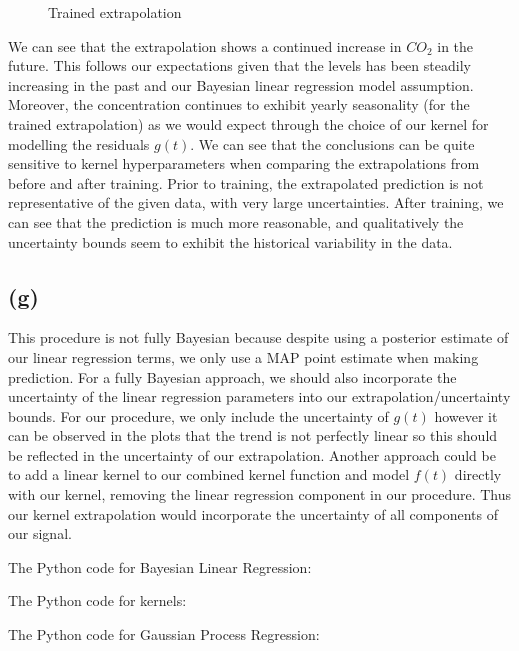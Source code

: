 \documentclass[12pt]{article}
\begin{document}
\begin{figure}[h]
\begin{minipage}{.5\textwidth}
\caption{Trained extrapolation}
\label{fig:f-extrapolation-trained}
\end{minipage}
\end{figure}

We can see that the extrapolation shows a continued increase in $CO_2$ in the future.
This follows our expectations given that the levels has been steadily increasing in the past and our Bayesian linear regression model assumption.
Moreover, the concentration continues to exhibit yearly seasonality (for the trained extrapolation) as we would expect through the choice of our kernel for modelling the residuals $g(t)$.
We can see that the conclusions can be quite sensitive to kernel hyperparameters when comparing the extrapolations from before and after training.
Prior to training, the extrapolated prediction is not representative of the given data, with very large uncertainties.
After training, we can see that the prediction is much more reasonable, and qualitatively the uncertainty bounds seem to exhibit the historical variability in the data.


\subsection*{(g)}

This procedure is not fully Bayesian because despite using a posterior estimate of our linear regression terms, we only use a MAP point estimate when making prediction.
For a fully Bayesian approach, we should also incorporate the uncertainty of the linear regression parameters into our extrapolation/uncertainty bounds.
For our procedure, we only include the uncertainty of $g(t)$ however it can be observed in the plots that the trend is not perfectly linear so this should be reflected in the uncertainty of our extrapolation.
Another approach could be to add a linear kernel to our combined kernel function and model $f(t)$ directly with our kernel, removing the linear regression component in our procedure.
Thus our kernel extrapolation would incorporate the uncertainty of all components of our signal.

\newpage
The Python code for Bayesian Linear Regression:


\newpage
The Python code for kernels:


\newpage
The Python code for Gaussian Process Regression:

\end{document}
